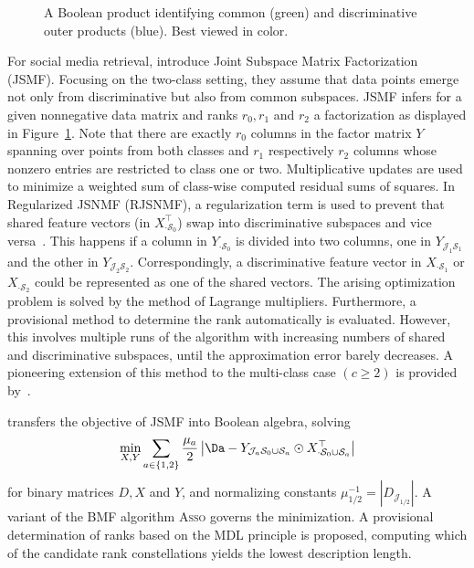 \begin{figure}[!t]
\centering

\caption{A Boolean product identifying common (green) and discriminative outer products (blue). Best viewed in color.}
\label{fig:CS:usageJSMF}
\end{figure}
For social media retrieval, \cite{gupta2010nonnegative} introduce Joint Subspace Matrix Factorization (JSMF). Focusing on the two-class setting, they assume that data points emerge not only from discriminative but also from common subspaces. JSMF infers for a given nonnegative data matrix and ranks $r_0,r_1$ and $r_2$ a factorization as displayed in Figure~\ref{fig:CS:usageJSMF}. Note that there are exactly $r_0$ columns in the factor matrix $Y$ spanning over points from both classes and $r_1$ respectively $r_2$ columns whose nonzero entries are restricted to class one or two. Multiplicative updates are used to minimize a weighted sum of class-wise computed residual sums of squares.
In Regularized JSNMF (RJSNMF), a regularization term is used to prevent that shared feature vectors (in $X_{\cdot \mathcal{S}_0}^\top $) swap into discriminative subspaces and vice versa~\citep{gupta2013regularized}. This happens if a column in $Y_{\cdot \mathcal{S}_0}$ is divided into two columns, one in $Y_{\mathcal{J}_1 \mathcal{S}_1}$ and the other in $Y_{\mathcal{J}_2 \mathcal{S}_2}$. Correspondingly, a discriminative feature vector in $X_{\cdot \mathcal{S}_1}$ or $X_{\cdot \mathcal{S}_2}$ could be represented as one of the shared vectors. The arising optimization problem is solved by the method of Lagrange multipliers. Furthermore, a provisional method to determine the rank automatically is evaluated. However, this involves multiple runs of the algorithm with increasing numbers of shared and discriminative subspaces, until the approximation error barely decreases.
A pioneering extension of this method to the multi-class case $(c\geq 2)$ is provided by~\cite{gupta2014matrix}.

\cite{miettienen2012finding} transfers the objective of JSMF into Boolean algebra, solving
\[\min_{X,Y}\sum_{a\in\{1,2\}}\frac{\mu_a}{2}\left\lvert\Da-
Y_{\mathcal{J}_a \mathcal{S}_0\cup \mathcal{S}_a} \odot
	X_{\cdot \mathcal{S}_0\cup \mathcal{S}_a}^\top \right\rvert \]
for binary matrices $D, X$ and $Y$, and normalizing constants $\mu_{1/2}^{-1} =\left\lvert D_{\mathcal{J}_{1/2}}\right\rvert $.  A variant of the BMF algorithm \textsc{Asso} governs the minimization. A provisional determination of ranks based on the MDL principle is proposed, computing which of the candidate rank constellations yields the lowest description length.

